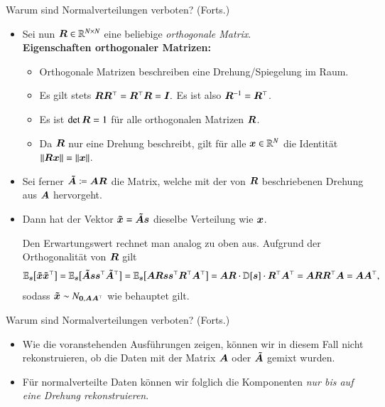 \begin{frame}{Warum sind Normalverteilungen verboten? (Forts.)}{}
	\begin{itemize}
		\item Sei nun $\bm{R} \in \mathbb{R}^{N \times N}$ eine beliebige \textit{orthogonale Matrix}. \\ \vspace*{2mm}
		\textbf{Eigenschaften orthogonaler Matrizen:}
		\begin{itemize}
			\item Orthogonale Matrizen beschreiben eine Drehung/Spiegelung im Raum.
			\item Es gilt stets $\bm{R} \bm{R}^\top = \bm{R}^\top \bm{R} = \bm{I}.$ Es ist also $\bm{R}^{-1} = \bm{R}^\top$.
			\item Es ist $\det \bm{R} = 1$ für alle orthogonalen Matrizen $\bm{R}$.
			\item Da $\bm{R}$ nur eine Drehung beschreibt, gilt für alle $\bm{x} \in \mathbb{R}^N$ die Identität
				$\Vert \bm{R} \bm{x} \Vert = \Vert \bm{x} \Vert$.
		\end{itemize}
		\item Sei ferner $\bm{\tilde{A}} \coloneqq \bm{A} \bm{R}$ die Matrix, welche mit der von $\bm{R}$ beschriebenen Drehung
			aus $\bm{A}$ hervorgeht.
		\item Dann hat der Vektor $\bm{\tilde{x}} = \bm{\tilde{A}} \bm{s}$ dieselbe Verteilung wie $\bm{x}$. \\ \vspace*{2mm}
		\begin{myproof}
			Den Erwartungswert rechnet man analog zu oben aus. Aufgrund der Orthogonalität von $\bm{R}$ gilt
			\begin{equation*}
				\mathbb{E}_{\bm{s}}\bigl[ \bm{\tilde{x}} \bm{\tilde{x}}^\top \bigr]
					= \mathbb{E}_{\bm{s}}\bigl[ \bm{\tilde{A}} \bm{s} \bm{s}^\top \bm{\tilde{A}}^\top \bigr]
					= \mathbb{E}_{\bm{s}}\bigl[ \bm{A} \bm{R} \bm{s} \bm{s}^\top \bm{R}^\top \bm{A}^\top \bigr]
					= \bm{A} \bm{R} \cdot \mathbb{D}[\bm{s}] \cdot \bm{R}^\top \bm{A}^\top
					= \bm{A} \bm{R} \bm{R}^\top \bm{A}
					= \bm{A} \bm{A}^\top,
			\end{equation*}
			sodass $\bm{\tilde{x}} \sim N_{\bm{0}, \bm{A} \bm{A}^\top}$ wie behauptet gilt.
		\end{myproof}
	\end{itemize}
\end{frame}


\begin{frame}{Warum sind Normalverteilungen verboten? (Forts.)}{}
	\begin{itemize}
		\item Wie die voranstehenden Ausführungen zeigen, können wir in diesem Fall nicht rekonstruieren,
			ob die Daten mit der Matrix $\bm{A}$ oder $\bm{\tilde{A}}$ gemixt wurden.
		\item Für normalverteilte Daten können wir folglich die Komponenten \textit{nur bis auf eine Drehung rekonstruieren}.
	\end{itemize}
\end{frame}


